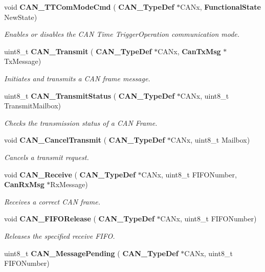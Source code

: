 \begin{DoxyCompactItemize}
void \textbf{ C\+A\+N\+\_\+\+T\+T\+Com\+Mode\+Cmd} (\textbf{ C\+A\+N\+\_\+\+Type\+Def} $\ast$C\+A\+Nx, \textbf{ Functional\+State} New\+State)
\begin{DoxyCompactList}\small\item\em Enables or disables the C\+AN Time Trigger\+Operation communication mode. \end{DoxyCompactList}\item 
uint8\+\_\+t \textbf{ C\+A\+N\+\_\+\+Transmit} (\textbf{ C\+A\+N\+\_\+\+Type\+Def} $\ast$C\+A\+Nx, \textbf{ Can\+Tx\+Msg} $\ast$Tx\+Message)
\begin{DoxyCompactList}\small\item\em Initiates and transmits a C\+AN frame message. \end{DoxyCompactList}\item 
uint8\+\_\+t \textbf{ C\+A\+N\+\_\+\+Transmit\+Status} (\textbf{ C\+A\+N\+\_\+\+Type\+Def} $\ast$C\+A\+Nx, uint8\+\_\+t Transmit\+Mailbox)
\begin{DoxyCompactList}\small\item\em Checks the transmission status of a C\+AN Frame. \end{DoxyCompactList}\item 
void \textbf{ C\+A\+N\+\_\+\+Cancel\+Transmit} (\textbf{ C\+A\+N\+\_\+\+Type\+Def} $\ast$C\+A\+Nx, uint8\+\_\+t Mailbox)
\begin{DoxyCompactList}\small\item\em Cancels a transmit request. \end{DoxyCompactList}\item 
void \textbf{ C\+A\+N\+\_\+\+Receive} (\textbf{ C\+A\+N\+\_\+\+Type\+Def} $\ast$C\+A\+Nx, uint8\+\_\+t F\+I\+F\+O\+Number, \textbf{ Can\+Rx\+Msg} $\ast$Rx\+Message)
\begin{DoxyCompactList}\small\item\em Receives a correct C\+AN frame. \end{DoxyCompactList}\item 
void \textbf{ C\+A\+N\+\_\+\+F\+I\+F\+O\+Release} (\textbf{ C\+A\+N\+\_\+\+Type\+Def} $\ast$C\+A\+Nx, uint8\+\_\+t F\+I\+F\+O\+Number)
\begin{DoxyCompactList}\small\item\em Releases the specified receive F\+I\+FO. \end{DoxyCompactList}\item 
uint8\+\_\+t \textbf{ C\+A\+N\+\_\+\+Message\+Pending} (\textbf{ C\+A\+N\+\_\+\+Type\+Def} $\ast$C\+A\+Nx, uint8\+\_\+t F\+I\+F\+O\+Number)

\end{DoxyCompactItemize}
